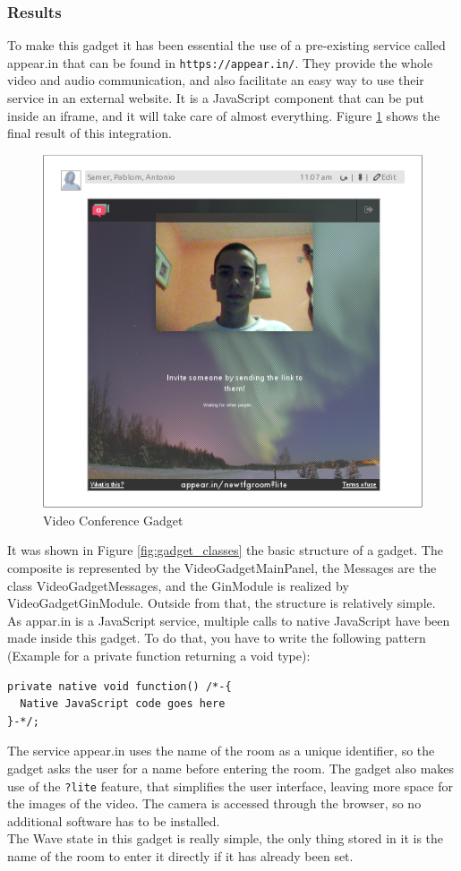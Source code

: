 \subsubsection{Results}
To make this gadget it has been essential the use of a pre-existing service called appear.in that can be found in \verb|https://appear.in/|. They provide the whole video and audio communication, and also facilitate an easy way to use their service in an external website. It is a JavaScript component that can be put inside an iframe, and it will take care of almost everything. Figure \ref{fig:video_gadget} shows the final result of this integration.\\[.2cm]
\begin{figure}[h]
  \center
    \includegraphics[keepaspectratio, scale=0.5]{Media/Captures/Extensions/VideoGadget.png}
  \caption{Video Conference Gadget}
  \label{fig:video_gadget}
\end{figure}
It was shown in Figure \ref{fig:gadget_classes} the basic structure of a gadget. The composite is represented by the VideoGadgetMainPanel, the Messages are the class VideoGadgetMessages, and the GinModule is realized by VideoGadgetGinModule. Outside from that, the structure is relatively simple.\\[.2cm]
As appar.in is a JavaScript service, multiple calls to native JavaScript have been made inside this gadget. To do that, you have to write the following pattern (Example for a private function returning a void type):
\begin{verbatim}
private native void function() /*-{
  Native JavaScript code goes here
}-*/;
\end{verbatim}
The service appear.in uses the name of the room as a unique identifier, so the gadget asks the user for a name before entering the room. The gadget also makes use of the \verb|?lite| feature, that simplifies the user interface, leaving more space for the images of the video. The camera is accessed through the browser, so no additional software has to be installed.\\[.2cm]
The Wave state in this gadget is really simple, the only thing stored in it is the name of the room to enter it directly if it has already been set.
